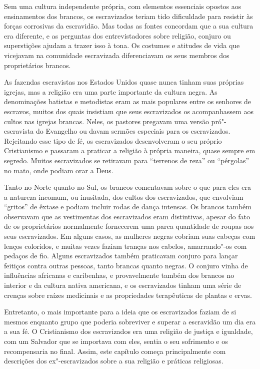 {\small
Sem uma cultura independente própria, com elementos essenciais
opostos aos ensinamentos dos brancos, os escravizados teriam tido
dificuldade para resistir às forças corrosivas da escravidão. Mas todas
as fontes concordam que a sua cultura era diferente, e as perguntas dos
entrevistadores sobre religião, conjuro ou superstições ajudam a trazer
isso à tona. Os costumes e atitudes de vida que vicejavam na comunidade
escravizada diferenciavam os seus membros dos proprietários brancos.

As fazendas escravistas nos Estados Unidos quase nunca tinham suas
próprias igrejas, mas a religião era uma parte importante da cultura
negra. As denominações batistas e metodistas eram as mais populares
entre os senhores de escravos, muitos dos quais insistiam que seus
escravizados os acompanhassem aos cultos nas igrejas brancas. Neles, os
pastores pregavam uma versão pró"-escravista do Evangelho ou davam
sermões especiais para os escravizados. Rejeitando esse tipo de fé, os
escravizados desenvolveram o seu próprio Cristianismo e passaram a praticar
a religião à própria maneira, quase sempre em segredo. Muitos escravizados
se retiravam para ``terrenos de reza'' ou ``pérgolas'' no mato, onde
podiam orar a Deus.

Tanto no Norte quanto no Sul, os brancos comentavam sobre o que
para eles era a natureza incomum, ou inusitada, dos cultos dos escravizados,
que envolviam ``gritos'' de êxtase e podiam incluir rodas de dança
intensas. Os brancos também observavam que as vestimentas dos escravizados
eram distintivas, apesar do fato de os proprietários normalmente
fornecerem uma parca quantidade de roupas aos seus escravizados. Em alguns
casos, as mulheres negras cobriam suas cabeças com lenços coloridos, e
muitas vezes faziam tranças nos cabelos, amarrando"-os com pedaços de
fio. Alguns escravizados também praticavam conjuro para lançar feitiços
contra outras pessoas, tanto brancas quanto negras. O conjuro vinha de
influências africanas e caribenhas, e provavelmente também dos brancos
no interior e da cultura nativa americana, e os escravizados tinham uma
série de crenças sobre raízes medicinais e as propriedades terapêuticas
de plantas e ervas.

Entretanto, o mais importante para a ideia que os escravizados faziam
de si mesmos enquanto grupo que poderia sobreviver e superar a
escravidão um dia era a sua fé. O Cristianismo dos escravizados era uma
religião de justiça e igualdade, com um Salvador que se importava com
eles, sentia o seu sofrimento e os recompensaria no final. Assim, este
capítulo começa principalmente com descrições dos ex"-escravizados sobre a
sua religião e práticas religiosas.
}

